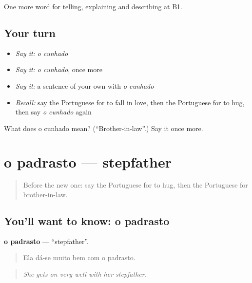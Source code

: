 \begin{grammarlens}[title={What you've built}]
One more word for telling, explaining and describing at B1.
\end{grammarlens}

\subsection*{Your turn}
\begin{itemize}
\raggedright
  \item \emph{Say it:} \emph{o cunhado}
  \item \emph{Say it:} \emph{o cunhado}, once more
  \item \emph{Say it:} a sentence of your own with \emph{o cunhado}
  \item \emph{Recall:} say the Portuguese for to fall in love, then the Portuguese for to hug, then say \emph{o cunhado} again
\end{itemize}

\begin{tcolorbox}[breakable,colback=teal!4,colframe=teal!35!black,title={Before you move on}]
What does o cunhado mean? (\textquotedblleft{}Brother-in-law\textquotedblright{}.) Say it once more.
\end{tcolorbox}
\section[o padrasto]{o padrasto — stepfather}

\label{lesson:PT-C492-padrasto}



\begin{quote}
Before the new one: say the Portuguese for to hug, then the Portuguese for brother-in-law.
\end{quote}

\subsection*{You'll want to know: o padrasto}
\textbf{o padrasto} — \textquotedblleft{}stepfather\textquotedblright{}.

\begin{quote}
Ela dá-se muito bem com o padrasto.
\end{quote}

\begin{quote}
\emph{She gets on very well with her stepfather.}
\end{quote}


